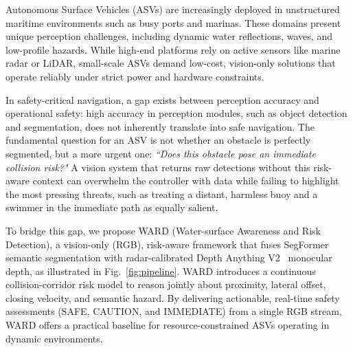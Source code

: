Autonomous Surface Vehicles (ASVs) are increasingly deployed in unstructured maritime environments such as busy ports and marinas. These domains present unique perception challenges, including dynamic water reflections, waves, and low-profile hazards. %
While high-end platforms rely on active sensors like marine radar or LiDAR, small-scale ASVs demand low-cost, vision-only solutions that operate reliably under strict power and hardware constraints.

In safety-critical navigation, a gap exists between perception accuracy and operational safety: high accuracy in perception modules, such as object detection and segmentation, does not inherently translate into safe navigation. The fundamental question for an ASV is not whether an obstacle is perfectly segmented, but a more urgent one: \emph{``Does this obstacle pose an immediate collision risk?"} A vision system that returns raw detections without this risk-aware context can overwhelm the controller with data while failing to highlight the most pressing threats, such as treating a distant, harmless buoy and a swimmer in the immediate path as equally salient.

To bridge this gap, we propose WARD (Water-surface Awareness and Risk Detection), a vision-only (RGB), risk-aware framework that fuses SegFormer~\cite{xie2021segformersimpleefficientdesign} semantic segmentation with radar-calibrated Depth Anything V2~\cite{yang2024depthv2} monocular depth, as illustrated in Fig.~\ref{fig:pipeline}. WARD introduces a continuous collision-corridor risk model to reason jointly about proximity, lateral offset, closing velocity, and semantic hazard. By delivering actionable, real-time safety assessments (SAFE, CAUTION, and IMMEDIATE) from a single RGB stream, WARD offers a practical baseline for resource-constrained ASVs operating in dynamic environments.


%
